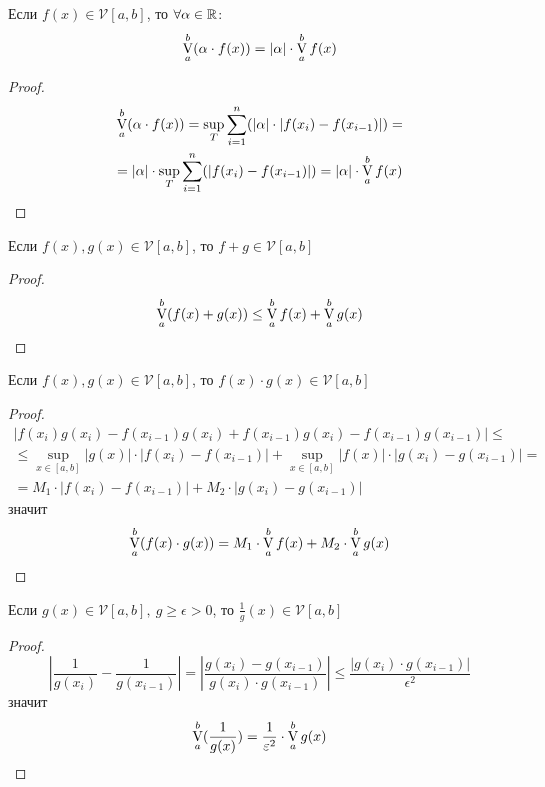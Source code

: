 \begin{numtheorem}
    Если $f(x)\in \mathcal{V} [a,b]$, то $\forall \alpha\in \mathbb{R}$:
    \[\operatorname*{V}\limits_{a}^{b}(\alpha\cdot f(x))=|\alpha|\cdot \operatorname*{V}\limits_{a}^{b} f(x)\] 
\end{numtheorem} 
\begin{proof}
    \begin{multline*}
        \operatorname*{V}\limits_{a}^{b}(\alpha\cdot f(x))=\sup\limits_T \sum\limits_{i=1}^{n}(|\alpha|\cdot|f(x_i)-f(x_{i-1})|)=\\
        =|\alpha|\cdot \sup\limits_T \sum\limits_{i=1}^{n}(|f(x_i)-f(x_{i-1})|)=|\alpha|\cdot \operatorname*{V}\limits_{a}^{b}f(x)
    \end{multline*} 
\end{proof} 
\begin{numtheorem}
    Если $f(x),g(x)\in \mathcal{V}[a,b]$, то $f+g\in \mathcal{V}[a,b]$
\end{numtheorem} 
\begin{proof}
    \[\operatorname*{V}\limits_{a}^{b} (f(x)+g(x))\leq \operatorname*{V}\limits_{a}^{b} f(x)+\operatorname*{V}\limits_{a}^{b} g(x)\]
\end{proof} 
\begin{numtheorem}
    Если $f(x),g(x)\in \mathcal{V}[a,b]$, то $f(x)\cdot g(x)\in \mathcal{V}[a,b]$
\end{numtheorem} 
\begin{proof}
    \begin{multline*}
        |f(x_i)g(x_i)-f(x_{i-1})g(x_i)+f(x_{i-1})g(x_{i})-f(x_{i-1})g(x_{i-1})|\leq\\
        \leq \sup\limits_{x\in [a,b]}|g(x)|\cdot |f(x_i)-f(x_{i-1})|+\sup\limits_{x\in [a,b]}|f(x)|\cdot |g(x_i)-g(x_{i-1})|=\\
        =M_1\cdot |f(x_i)-f(x_{i-1})|+M_2\cdot |g(x_i)-g(x_{i-1})|
    \end{multline*}
    значит
    \[\operatorname*{V}\limits_{a}^{b}(f(x)\cdot g(x))=M_1\cdot \operatorname*{V}\limits_{a}^{b}f(x)+M_2\cdot \operatorname*{V}\limits_{a}^{b}g(x)\]
\end{proof} 
\begin{numtheorem}
    Если $g(x)\in \mathcal{V}[a,b],\ g\geq \epsilon>0$, то $\frac{1}{g}(x)\in \mathcal{V}[a,b]$
\end{numtheorem} 
\begin{proof}
    \[\left|\frac{1}{g(x_i)}-\frac{1}{g(x_{i-1})}\right|=\left|\frac{g(x_i)-g(x_{i-1})}{g(x_i)\cdot g(x_{i-1})}\right|\leq \frac{|g(x_i)\cdot g(x_{i-1})|}{\epsilon^2}\]
    значит
    \[\operatorname*{V}\limits_{a}^{b}(\frac{1}{g(x)})=\frac{1}{\varepsilon^2}\cdot \operatorname*{V}\limits_{a}^{b}g(x)\]
\end{proof} 
